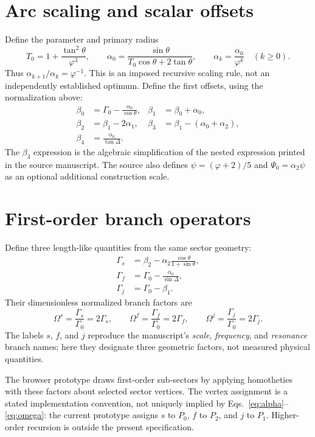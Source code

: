 \documentclass[10pt,letterpaper]{article}
\begin{document}
\section{Arc scaling and scalar offsets}
Define the parameter and primary radius
\begin{equation}
T_0=1+\frac{\tan^2\theta}{\varphi^3},\qquad
\alpha_0=\frac{\sin\theta}{T_0\cos\theta+2\tan\theta},\qquad
\alpha_k=\frac{\alpha_0}{\varphi^k}\quad(k\geq0).
\label{eq:alpha}
\end{equation}
Thus $\alpha_{k+1}/\alpha_k=\varphi^{-1}$. This is an imposed recursive scaling rule, not an independently established optimum. Define the first offsets, using the normalization above:
\begin{align}
\beta_0&=\Gamma_0-\frac{\alpha_0}{\cos\theta}, &
\beta_1&=\beta_0+\alpha_0,\\
\beta_2&=\beta_1-2\alpha_1, &
\beta_3&=\beta_1-(\alpha_0+\alpha_2),\\
\beta_4&=\frac{\alpha_0}{\tan\Delta}.&&
\end{align}
The $\beta_3$ expression is the algebraic simplification of the nested expression printed in the source manuscript. The source also defines $\psi=(\varphi+2)/5$ and $\Psi_0=\alpha_2\psi$ as an optional additional construction scale.

\section{First-order branch operators}
Define three length-like quantities from the same sector geometry:
\begin{align}
\Gamma_s&=\beta_2-\alpha_2\frac{\cos\theta}{1+\sin\theta},\\
\Gamma_f&=\Gamma_0-\frac{\alpha_0}{\sin\Delta},\\
\Gamma_j&=\Gamma_0-\beta_1.
\end{align}
Their dimensionless normalized branch factors are
\begin{equation}
\Omega^s=\frac{\Gamma_s}{\Gamma_0}=2\Gamma_s,\qquad
\Omega^f=\frac{\Gamma_f}{\Gamma_0}=2\Gamma_f,\qquad
\Omega^j=\frac{\Gamma_j}{\Gamma_0}=2\Gamma_j.
\label{eq:omega}
\end{equation}
The labels $s$, $f$, and $j$ reproduce the manuscript's \emph{scale}, \emph{frequency}, and \emph{resonance} branch names; here they designate three geometric factors, not measured physical quantities.

The browser prototype draws first-order sub-sectors by applying homotheties with these factors about selected sector vertices. The vertex assignment is a stated implementation convention, not uniquely implied by Eqs.~\eqref{eq:alpha}--\eqref{eq:omega}: the current prototype assigns $s$ to $P_0$, $f$ to $P_2$, and $j$ to $P_1$. Higher-order recursion is outside the present specification.
\end{document}
